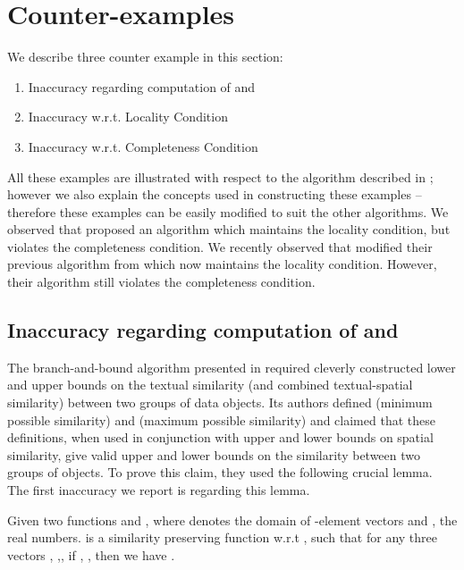 \documentclass[prodmode,letterpaper]{acmsmall}
\begin{document}
\section{Counter-examples}\label{section:counter-ex}
We describe three counter example in this section:
\begin{enumerate}
    \item Inaccuracy regarding computation of  and 
    \item Inaccuracy w.r.t. Locality Condition
    \item Inaccuracy w.r.t. Completeness Condition
\end{enumerate}
All these examples are
illustrated with respect to the algorithm described in \cite{lu2011reverse};
however we also
explain the concepts used in constructing these examples -- therefore these
examples can be easily modified to suit the other algorithms.
We observed that \cite{achtert2009reverse} proposed an algorithm which maintains
the locality condition, but violates the completeness condition. We recently
observed that \cite{lu2014efficient} modified their previous algorithm from
\cite{lu2011reverse} which now maintains the locality condition. However, their algorithm still violates the completeness condition.

\subsection{Inaccuracy regarding computation of  and }
The branch-and-bound algorithm presented in \cite{lu2011reverse} required
cleverly constructed lower and upper bounds on the textual similarity (and combined
textual-spatial similarity) between two groups of data objects. Its authors defined
 (minimum possible similarity) and  (maximum possible similarity)
and claimed that these definitions, when used in conjunction with upper and
lower bounds on spatial similarity, give valid upper and lower bounds on the
similarity between two groups of objects. To prove this claim, they used the
following crucial lemma. The first inaccuracy we report is regarding this lemma.

\begin{definition} \cite{lu2011reverse} Given
    two functions  and , where  denotes the
    domain of -element vectors and , the real numbers.  is
    a similarity preserving function w.r.t , such that for any three vectors
    , ,, if ,
    , then we have .
\label{defn:similarity_PF}
\end{definition}
\end{document}
